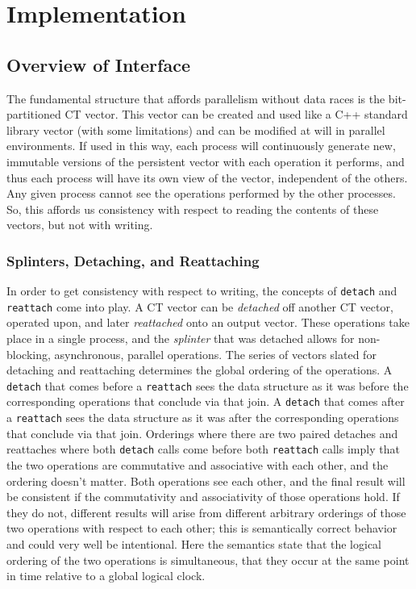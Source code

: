 \chapter{Implementation}

\section{Overview of Interface}
The fundamental structure that affords parallelism without data races is the
bit-partitioned CT vector. This vector can be created and used like a C++
standard library vector (with some limitations) and can be modified at will in
parallel environments. If used in this way, each process will continuously
generate new, immutable versions of the persistent vector with each operation it
performs, and thus each process will have its own view of the vector,
independent of the others. Any given process cannot see the operations performed
by the other processes. So, this affords us consistency with respect to reading
the contents of these vectors, but not with writing.

\subsection{Splinters, Detaching, and Reattaching} In order to get consistency
with respect to writing, the concepts of \texttt{detach} and \texttt{reattach}
come into play. A CT vector can be \textit{detached} off another CT vector,
operated upon, and later \textit{reattached} onto an output vector. These
operations take place in a single process, and the \textit{splinter} that was
detached allows for non-blocking, asynchronous, parallel operations. The series
of vectors slated for detaching and reattaching determines the global ordering
of the operations. A \texttt{detach} that comes before a \texttt{reattach} sees
the data structure as it was before the corresponding operations that conclude
via that join. A \texttt{detach} that comes after a \texttt{reattach} sees the
data structure as it was after the corresponding operations that conclude via
that join. Orderings where there are two paired detaches and reattaches where
both \texttt{detach} calls come before both \texttt{reattach} calls imply that
the two operations are commutative and associative with each other, and the
ordering doesn't matter. Both operations see each other, and the final result
will be consistent if the commutativity and associativity of those operations
hold. If they do not, different results will arise from different arbitrary
orderings of those two operations with respect to each other; this is
semantically correct behavior and could very well be intentional.  Here the
semantics state that the logical ordering of the two operations is simultaneous,
that they occur at the same point in time relative to a global logical clock.

